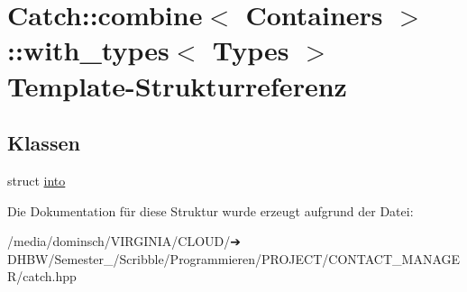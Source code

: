 \hypertarget{structCatch_1_1combine_1_1with__types}{}\section{Catch\+:\+:combine$<$ Containers $>$\+:\+:with\+\_\+types$<$ Types $>$ Template-\/\+Strukturreferenz}
\label{structCatch_1_1combine_1_1with__types}
\subsection*{Klassen}
\begin{DoxyCompactItemize}
\item 
struct \hyperlink{structCatch_1_1combine_1_1with__types_1_1into}{into}
\end{DoxyCompactItemize}


Die Dokumentation für diese Struktur wurde erzeugt aufgrund der Datei\+:\begin{DoxyCompactItemize}
\item 
/media/dominsch/\+V\+I\+R\+G\+I\+N\+I\+A/\+C\+L\+O\+U\+D/➔ D\+H\+B\+W/\+Semester\+\_/\+Scribble/\+Programmieren/\+P\+R\+O\+J\+E\+C\+T/\+C\+O\+N\+T\+A\+C\+T\+\_\+\+M\+A\+N\+A\+G\+E\+R/catch.\+hpp\end{DoxyCompactItemize}
